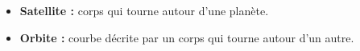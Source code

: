\begin{mydefs}
	\begin{itemize}
		\item \textbf{Satellite :} corps qui tourne autour d'une planète.
		\item \textbf{Orbite :} courbe décrite par un corps qui tourne autour d'un autre.
	\end{itemize}
\end{mydefs}